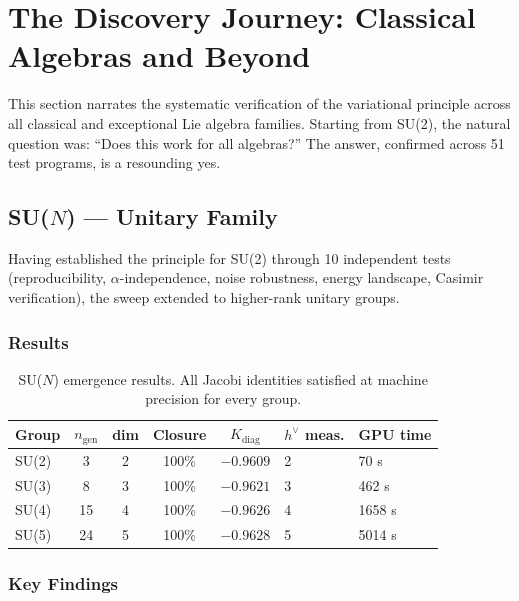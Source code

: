 \section{The Discovery Journey: Classical Algebras and Beyond}\label{sec:classical}

This section narrates the systematic verification of the variational principle across all classical and exceptional Lie algebra families. Starting from SU(2), the natural question was: ``Does this work for all algebras?'' The answer, confirmed across 51 test programs, is a resounding yes.

\subsection{SU($N$) --- Unitary Family}\label{sec:su_n}

Having established the principle for SU(2) through 10 independent tests (reproducibility, $\alpha$-independence, noise robustness, energy landscape, Casimir verification), the sweep extended to higher-rank unitary groups.

\subsubsection{Results}

\begin{table}[H]
\centering
\begin{tabular}{lccccll}
\hline\hline
\textbf{Group} & \textbf{$n_{\mathrm{gen}}$} & \textbf{dim} & \textbf{Closure} & \textbf{$K_{\mathrm{diag}}$} & \textbf{$h^\vee$ meas.} & \textbf{GPU time} \\
\hline
SU(2) & 3 & 2 & 100\% & $-0.9609$ & 2 & 70 s \\
SU(3) & 8 & 3 & 100\% & $-0.9621$ & 3 & 462 s \\
SU(4) & 15 & 4 & 100\% & $-0.9626$ & 4 & 1658 s \\
SU(5) & 24 & 5 & 100\% & $-0.9628$ & 5 & 5014 s \\
\hline\hline
\end{tabular}
\caption{SU($N$) emergence results. All Jacobi identities satisfied at machine precision for every group.}
\label{tab:su_n_results}
\end{table}

\subsubsection{Key Findings}

